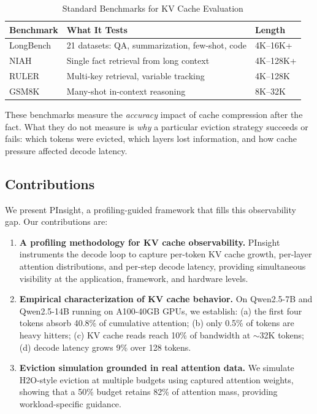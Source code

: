 \documentclass[conference]{IEEEtran}
\begin{document}
\begin{table}[h]
\centering
\caption{Standard Benchmarks for KV Cache Evaluation}
\label{tab:benchmarks}
\begin{tabular}{@{}p{1.8cm}p{3.2cm}p{2cm}@{}}
\toprule
\textbf{Benchmark} & \textbf{What It Tests} & \textbf{Length} \\
\midrule
LongBench & 21 datasets: QA, summarization, few-shot, code & 4K--16K+ \\
NIAH & Single fact retrieval from long context & 4K--128K+ \\
RULER & Multi-key retrieval, variable tracking & 4K--128K \\
GSM8K & Many-shot in-context reasoning & 8K--32K \\
\bottomrule
\end{tabular}
\end{table}

These benchmarks measure the \textit{accuracy} impact of cache compression after the fact. What they do not measure is \textit{why} a particular eviction strategy succeeds or fails: which tokens were evicted, which layers lost information, and how cache pressure affected decode latency.

\subsection{Contributions}

We present PInsight, a profiling-guided framework that fills this observability gap. Our contributions are:

\begin{enumerate}
\item \textbf{A profiling methodology for KV cache observability.} PInsight instruments the decode loop to capture per-token KV cache growth, per-layer attention distributions, and per-step decode latency, providing simultaneous visibility at the application, framework, and hardware levels.

\item \textbf{Empirical characterization of KV cache behavior.} On Qwen2.5-7B and Qwen2.5-14B running on A100-40GB GPUs, we establish: (a) the first four tokens absorb 40.8\% of cumulative attention; (b) only 0.5\% of tokens are heavy hitters; (c) KV cache reads reach 10\% of bandwidth at ${\sim}$32K tokens; (d) decode latency grows 9\% over 128 tokens.

\item \textbf{Eviction simulation grounded in real attention data.} We simulate H2O-style eviction at multiple budgets using captured attention weights, showing that a 50\% budget retains 82\% of attention mass, providing workload-specific guidance.
\end{enumerate}
\end{document}
